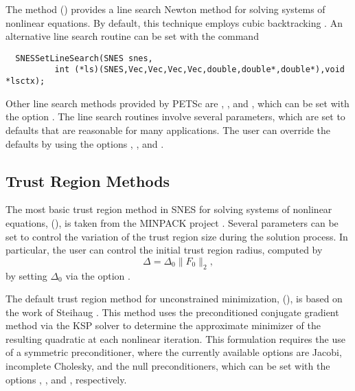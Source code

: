 The method  () provides a line
search Newton method for solving systems of nonlinear equations.  By
default, this technique employs cubic backtracking \cite{dennis:83}.
An alternative line search routine can be set with the command
\begin{verbatim}
  SNESSetLineSearch(SNES snes,
          int (*ls)(SNES,Vec,Vec,Vec,Vec,double,double*,double*),void *lsctx);
\end{verbatim}
Other line search methods provided by PETSc are 
, , and ,
 
which can be set with the option
. 
The line search routines involve several parameters, which are set
to defaults that are reasonable for many applications.  The user
can override the defaults by using the options
, 
, and 
. 


\subsection{Trust Region Methods}

The most basic trust region method in SNES for solving systems of nonlinear
equations,  (), is taken from
the MINPACK project \cite{more84}. Several parameters can be set to
control the variation of the trust region size during the solution
process.  In particular, the user can control the initial trust region
radius, computed by
\[
  \Delta = \Delta_0 \| F_0 \|_2,
\]
by setting $ \Delta_0 $ via the option 
.

The default trust region method for unconstrained minimization, 
 (), is based on the work of
Steihaug \cite{steihaug:83}.  This method uses the preconditioned
conjugate gradient method via the KSP solver  to determine
the approximate minimizer of the resulting quadratic at each nonlinear
iteration.  This formulation requires the use of a symmetric
preconditioner, where the currently available options are Jacobi,
incomplete Cholesky, and the null preconditioners, which can be set
with the options , , and , respectively.

